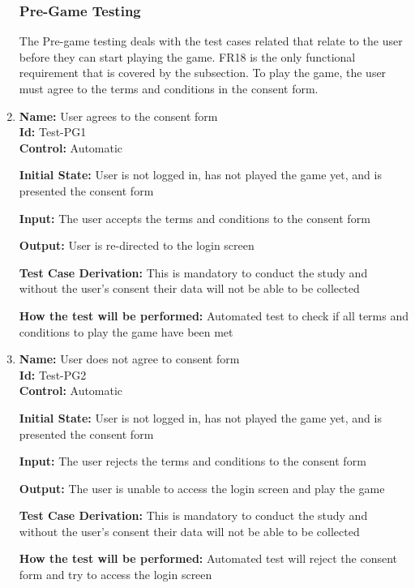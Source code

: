 \documentclass[12pt, titlepage]{article}
\begin{document}
\begin{enumerate}
\subsubsection{Pre-Game Testing}
The Pre-game testing deals with the test cases related that relate to the user before they can start playing the game. FR18 is the only functional requirement that is covered by the subsection. To play the game, the user must agree to the terms and conditions in the consent form. 

\item{\textbf{Name:} User agrees to the consent form\\} %
\textbf{Id:} Test-PG1 \label{Test-PG1}\\

\textbf{Control:} Automatic

\textbf{Initial State:} User is not logged in, has not played the game yet, and is presented the consent form

\textbf{Input:} The user accepts the terms and conditions to the consent form

\textbf{Output:} User is re-directed to the login screen

\textbf{Test Case Derivation:} This is mandatory to conduct the study and without the user's consent their data will not be able to be collected

\textbf{How the test will be performed:} Automated test to check if all terms and conditions to play the game have been met


\item{\textbf{Name:} User does not agree to consent form\\} %
\textbf{Id:} Test-PG2 \label{Test-PG2}\\

\textbf{Control:} Automatic

\textbf{Initial State:} User is not logged in, has not played the game yet, and is presented the consent form

\textbf{Input:} The user rejects the terms and conditions to the consent form

\textbf{Output:} The user is unable to access the login screen and play the game

\textbf{Test Case Derivation:} This is mandatory to conduct the study and without the user's consent their data will not be able to be collected

\textbf{How the test will be performed:} Automated test will reject the consent form and try to access the login screen


\end{enumerate}
\end{document}
